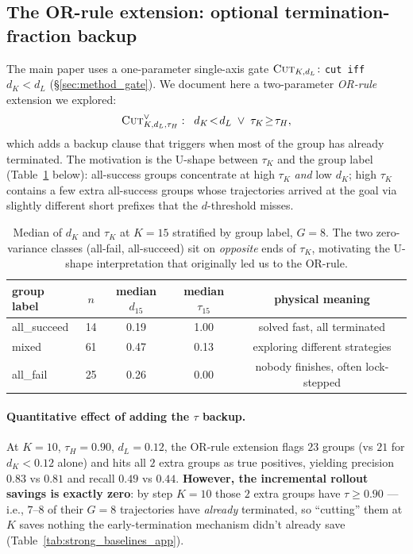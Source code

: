 \documentclass{article}
\begin{document}
\subsection{The OR-rule extension: optional termination-fraction backup}
\label{app:or_extension}

The main paper uses a one-parameter single-axis gate
$\textsc{Cut}_{K, d_L}\!:$ \texttt{cut iff} $d_K\!<\!d_L$
(\S\ref{sec:method_gate}). We document here a two-parameter
\emph{OR-rule} extension we explored:
\begin{equation}
\textsc{Cut}^{\lor}_{K, d_L, \tau_H}: \;\;
d_K\!<\!d_L \;\lor\; \tau_K\!\ge\!\tau_H,
\label{eq:or_rule}
\end{equation}
which adds a backup clause that triggers when most of the group
has already terminated. The motivation is the U-shape between
$\tau_K$ and the group label (Table~\ref{tab:ushape_app} below): all-success
groups concentrate at high $\tau_K$ \emph{and} low $d_K$; high $\tau_K$
contains a few extra all-success groups whose trajectories arrived at
the goal via slightly different short prefixes that the
$d$-threshold misses.

\begin{table}[h]
\centering
\caption{Median of $d_K$ and $\tau_K$ at $K\!=\!15$ stratified by
group label, $G\!=\!8$. The two zero-variance classes (all-fail,
all-succeed) sit on \emph{opposite} ends of $\tau_K$, motivating the
U-shape interpretation that originally led us to the OR-rule.}
\label{tab:ushape_app}
\begin{tabular}{lcccc}
\toprule
group label & $n$ & median $d_{15}$ & median $\tau_{15}$ & physical meaning \\
\midrule
all\_succeed & 14 & 0.19 & 1.00 & solved fast, all terminated \\
mixed        & 61 & 0.47 & 0.13 & exploring different strategies \\
all\_fail    & 25 & 0.26 & 0.00 & nobody finishes, often lock-stepped \\
\bottomrule
\end{tabular}
\end{table}

\paragraph{Quantitative effect of adding the $\tau$ backup.}
At $K\!=\!10$, $\tau_H\!=\!0.90$, $d_L\!=\!0.12$, the OR-rule
extension flags $23$ groups (vs $21$ for $d_K\!<\!0.12$ alone) and
hits all $2$ extra groups as true positives, yielding precision
$0.83$ vs $0.81$ and recall $0.49$ vs $0.44$.  \textbf{However, the
incremental rollout savings is exactly zero}: by step $K\!=\!10$
those $2$ extra groups have $\tau\!\ge\!0.90$ — i.e., $7$--$8$ of
their $G\!=\!8$ trajectories have \emph{already} terminated, so
``cutting'' them at $K$ saves nothing the early-termination
mechanism didn't already save (Table~\ref{tab:strong_baselines_app}).
\end{document}
